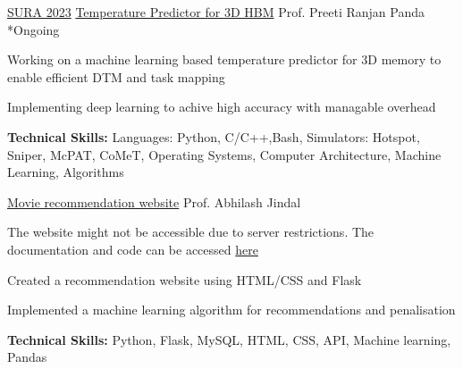

\begin{cventries}

    \cventry
    {\href{https://ird.iitd.ac.in/content/summer-undergraduate-research-award-sura}{SURA 2023}} %
    {\href{https://drive.google.com/file/d/1bPrm8CGhfgpJiiUOETPtByViym3-ykNJ/view?usp=share_link}{Temperature Predictor for 3D HBM}} %
    {Prof. Preeti Ranjan Panda} %
    {*Ongoing} %
    {
      \begin{cvitems} %
        \item {Working on a machine learning based temperature predictor for 3D memory to enable efficient DTM and task mapping}
        \item {Implementing deep learning to achive high accuracy with managable overhead}
        \item {\textbf{Technical Skills:} Languages: Python, C/C++,Bash, Simulators: Hotspot, Sniper, McPAT, CoMeT, Operating Systems, Computer Architecture, Machine Learning, Algorithms}
      \end{cvitems}
    }
  \vspace{3mm}
    \cventry
    {} %
    {\href{https://10.17.5.13:5050}{Movie recommendation website}} %
    {Prof. Abhilash Jindal} %
    {} %
    {
    \vspace{-3mm}
      \begin{cvitems} %
        \item {The website might not be accessible due to server restrictions. The documentation and code can be accessed \href{https://github.com/AnshikSahu/COP290-Assignment3-photons-WDID}{\textsf{here}}}
        \item {Created a recommendation website using HTML/CSS and Flask}
        \item{ Implemented a machine learning algorithm for recommendations and penalisation}
        \item {\textbf{Technical Skills:} Python, Flask, MySQL, HTML, CSS, API, Machine learning, Pandas}

\end{cvitems}}
\end{cventries}
